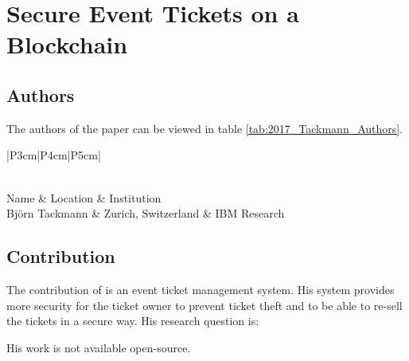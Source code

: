 \clearpage
\section*{\centering Secure Event Tickets on a Blockchain}

\subsection*{Authors}
The authors of the paper \cite{2017_Tackmann} can be viewed in table \ref{tab:2017_Tackmann_Authors}.
\begin{longtable}{ |P{3cm}|P{4cm}|P{5cm}| }
	\caption{Authors} \label{tab:2017_Tackmann_Authors} \\
	\hline
 	Name & Location & Institution \\ [0.5ex] 
 	\hline\hline
 	\endhead
 	Björn Tackmann & Zurich, Switzerland  & IBM Research  \\
	 \hline
\end{longtable}


\subsection*{Contribution}
The contribution of \citet{2017_Tackmann} is an event ticket management system. His system provides more security for the ticket owner to prevent ticket theft and to be able to re-sell the tickets in a secure way. His research question is:
\begin{displayquote}
\end{displayquote}
His work is not available open-source.

